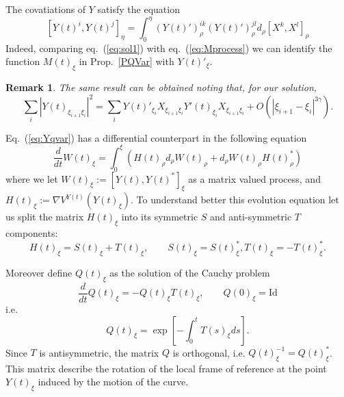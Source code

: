 \documentclass[a4paper,12pt,reqno]{amsart}
\newtheorem{remark}{Remark}
\begin{document}
The covatiations of $Y$ satisfy the equation
\begin{equation}
  \label{eq:Yqvar}
  [ Y(t)^i,Y(t)^j ]_{\eta} =
\int_{0}^{\eta} (Y(t)')^{ik}_\rho (Y(t)')^{jl}_\rho d_{\rho} [ X^k, X^l]_{\rho}
\end{equation}
Indeed, comparing
eq.~(\ref{eq:sol1}) with eq.~(\ref{eq:Mprocess}) we can identify the
function $M(t)_\xi$ in Prop.~\ref{PQVar} with $Y(t)'_\xi$.
\begin{remark}
The same result can be obtained noting that, for our solution,
\begin{equation*}
 \sum_i |Y(t)_{\xi_{i+1} \xi_{i}}|^2 = \sum_i Y(t)'_{\xi_i} X_{\xi_{i+1}
 \xi_{i}} Y'(t)_{\xi_i} X_{\xi_{i+1} \xi_{i}} + O(|\xi_{i+1}-\xi_i|^{3\gamma})
.
\end{equation*}  
\end{remark}

Eq.~(\ref{eq:Yqvar}) has a differential counterpart in the following equation
\begin{equation}
  \label{eq:dyn-Yqvar}
\frac{d}{dt} W(t)_\xi = \int_0^\xi (H(t)_\rho d_\rho W(t)_\rho 
+  d_\rho W(t)_\rho H(t)_\rho^*)
\end{equation}
where we let $W(t)_\xi := [Y(t),Y(t)^*]_\xi$ as a matrix valued process, and 
$H(t)_\xi := \nabla V^{Y(t)}(Y(t)_\xi)$. 
To understand better this evolution equation let us split the matrix
$H(t)_\xi$ into its symmetric $S$ and anti-symmetric $T$ components:
$$
H(t)_\xi = S(t)_\xi + T(t)_\xi, \qquad S(t)_\xi = S(t)_\xi^*, T(t)_\xi
= - T(t)_\xi^*.
$$

Moreover define $Q(t)_\xi$ as the solution of the Cauchy problem
$$
\frac{d}{dt} Q(t)_\xi = - Q(t)_\xi T(t)_\xi, \qquad Q(0)_\xi = \text{Id}
$$
i.e. 
$$
Q(t)_\xi = \exp\left[-\int_0^t T(s)_\xi ds \right].
$$
Since $T$ is antisymmetric, the matrix $Q$ is orthogonal,
i.e. $Q(t)_\xi^{-1} = Q(t)_\xi^*$. This matrix describe the
rotation of the local frame of reference at the point $Y(t)_\xi$
induced by the motion of the curve. 
\end{document}

